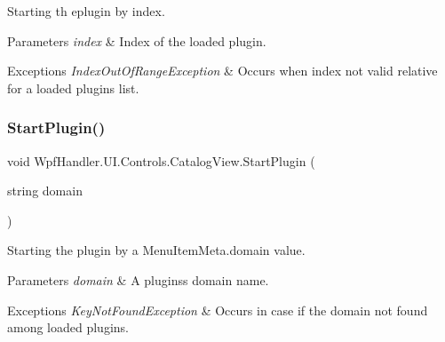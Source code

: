 Starting th eplugin by index. 


\begin{DoxyParams}{Parameters}
{\em index} & Index of the loaded plugin.\\
\hline
\end{DoxyParams}

\begin{DoxyExceptions}{Exceptions}
{\em Index\+Out\+Of\+Range\+Exception} & Occurs when index not valid relative for a loaded plugins list. \\
\hline
\end{DoxyExceptions}
\mbox{\label{class_wpf_handler_1_1_u_i_1_1_controls_1_1_catalog_view_ac22dfdce2ff1a076449c33adf17f1dc1}} 
\subsubsection{\texorpdfstring{Start\+Plugin()}{StartPlugin()}\hspace{0.1cm}{\footnotesize\ttfamily [2/2]}}
{\footnotesize\ttfamily void Wpf\+Handler.\+U\+I.\+Controls.\+Catalog\+View.\+Start\+Plugin (\begin{DoxyParamCaption}\item[{string}]{domain }\end{DoxyParamCaption})}



Starting the plugin by a Menu\+Item\+Meta.\+domain value. 


\begin{DoxyParams}{Parameters}
{\em domain} & A plugins\textquotesingle{}s domain name.\\
\hline
\end{DoxyParams}

\begin{DoxyExceptions}{Exceptions}
{\em Key\+Not\+Found\+Exception} & Occurs in case if the domain not found among loaded plugins. \\
\hline
\end{DoxyExceptions}
\mbox{\label{class_wpf_handler_1_1_u_i_1_1_controls_1_1_catalog_view_aad6922f8af811dedadc8b4b7ea95ef18}} 
